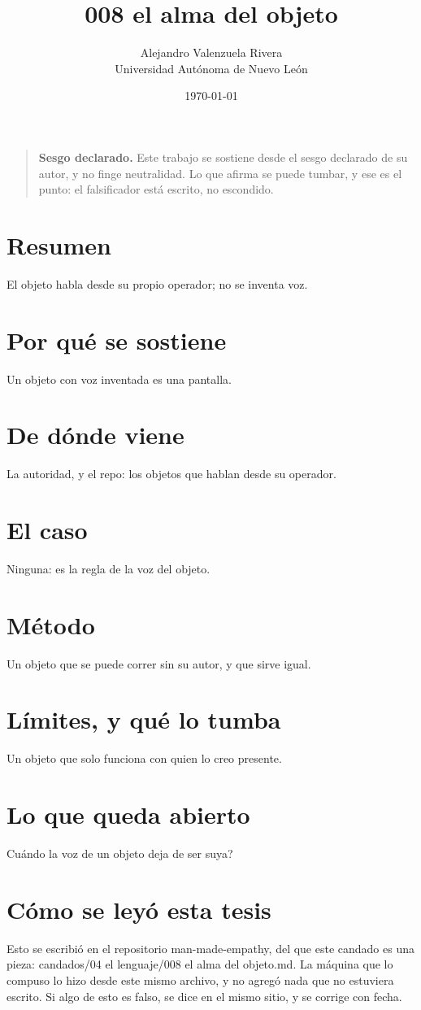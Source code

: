 \documentclass[11pt,a4paper]{article}
\title{008 el alma del objeto}
\author{Alejandro Valenzuela Rivera\\\small Universidad Autónoma de Nuevo León}
\date{\today}
\begin{document}
\maketitle

\begin{quote}
\textbf{Sesgo declarado.} Este trabajo se sostiene desde el sesgo declarado de su autor, y no finge neutralidad. Lo que afirma se puede tumbar, y ese es el punto: el falsificador está escrito, no escondido.
\end{quote}

\section*{Resumen}
El objeto habla desde su propio operador; no se inventa voz.

\section{Por qué se sostiene}
Un objeto con voz inventada es una pantalla.

\section{De dónde viene}
La autoridad, y el repo: los objetos que hablan desde su operador.

\section{El caso}
Ninguna: es la regla de la voz del objeto.

\section{Método}
Un objeto que se puede correr sin su autor, y que sirve igual.

\section{Límites, y qué lo tumba}
Un objeto que solo funciona con quien lo creo presente.

\section{Lo que queda abierto}
\textquestiondown{}Cuándo la voz de un objeto deja de ser suya?

\section*{Cómo se leyó esta tesis}
Esto se escribió en el repositorio man-made-empathy, del que este candado es una pieza: candados/04 el lenguaje/008 el alma del objeto.md. La máquina que lo compuso lo hizo desde este mismo archivo, y no agregó nada que no estuviera escrito. Si algo de esto es falso, se dice en el mismo sitio, y se corrige con fecha.
\end{document}
